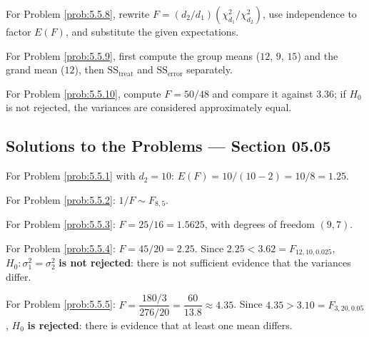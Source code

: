 \begin{sugerencia}
	\label{sug:5.5.8}
	For Problem \ref{prob:5.5.8}, rewrite $F=(d_2/d_1)(\chi^2_{d_1}/\chi^2_{d_2})$, use independence to factor $E(F)$, and substitute the given expectations.
\end{sugerencia}

\begin{sugerencia}
	\label{sug:5.5.9}
	For Problem \ref{prob:5.5.9}, first compute the group means ($12$, $9$, $15$) and the grand mean ($12$), then $\text{SS}_{\text{treat}}$ and $\text{SS}_{\text{error}}$ separately.
\end{sugerencia}

\begin{sugerencia}
	\label{sug:5.5.10}
	For Problem \ref{prob:5.5.10}, compute $F=50/48$ and compare it against $3.36$; if $H_0$ is not rejected, the variances are considered approximately equal.
\end{sugerencia}

\subsection*{Solutions to the Problems --- Section 05.05}

\begin{solucion}
	\label{sol:5.5.1}
	For Problem \ref{prob:5.5.1} with $d_2=10$: $E(F) = 10/(10-2) = 10/8 = 1.25$. \quad \qedhere
\end{solucion}

\begin{solucion}
	\label{sol:5.5.2}
	For Problem \ref{prob:5.5.2}: $1/F \sim F_{8,5}$. \quad \qedhere
\end{solucion}

\begin{solucion}
	\label{sol:5.5.3}
	For Problem \ref{prob:5.5.3}: $F = 25/16 = 1.5625$, with degrees of freedom $(9,7)$. \quad \qedhere
\end{solucion}

\begin{solucion}
	\label{sol:5.5.4}
	For Problem \ref{prob:5.5.4}: $F = 45/20 = 2.25$. Since $2.25 < 3.62 = F_{12,10,0.025}$, $H_0:\sigma_1^2=\sigma_2^2$ \textbf{is not rejected}: there is not sufficient evidence that the variances differ. \quad \qedhere
\end{solucion}

\begin{solucion}
	\label{sol:5.5.5}
	For Problem \ref{prob:5.5.5}: $F = \dfrac{180/3}{276/20} = \dfrac{60}{13.8} \approx 4.35$. Since $4.35 > 3.10 = F_{3,20,0.05}$, $H_0$ \textbf{is rejected}: there is evidence that at least one mean differs. \quad \qedhere
\end{solucion}

